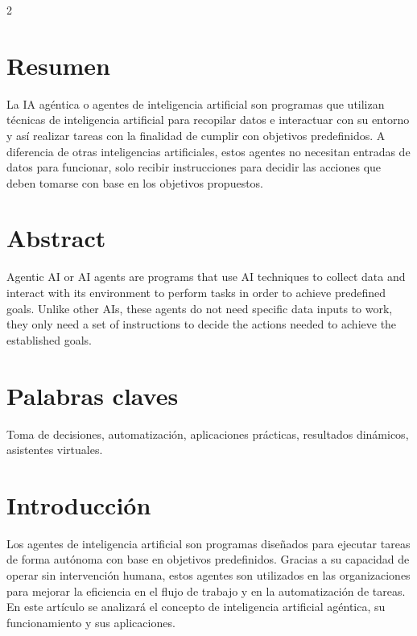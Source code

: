 \documentclass[12pt,spanish,Letterpaper,openany]{book}
\begin{document}
\begin {multicols}{2}

\hypertarget{resumen-7}{%
\section{Resumen}\label{resumen-7}}

La IA agéntica o agentes de inteligencia artificial son programas que utilizan técnicas de inteligencia artificial para recopilar datos e interactuar con su entorno y así realizar tareas con la finalidad de cumplir con objetivos predefinidos. A diferencia de otras inteligencias artificiales, estos agentes no necesitan entradas de datos para funcionar, solo recibir instrucciones para decidir las acciones que deben tomarse con base en los objetivos propuestos.

\hypertarget{abstract-7}{%
\section{Abstract}\label{abstract-7}}

Agentic AI or AI agents are programs that use AI techniques to collect data and interact with its environment to perform tasks in order to achieve predefined goals. Unlike other AIs, these agents do not need specific data inputs to work, they only need a set of instructions to decide the actions needed to achieve the established goals.

\hypertarget{palabras-claves-7}{%
\section{Palabras claves}\label{palabras-claves-7}}

Toma de decisiones, automatización, aplicaciones prácticas, resultados dinámicos, asistentes virtuales.

\hypertarget{introducciuxf3n-7}{%
\section{Introducción}\label{introducciuxf3n-7}}

Los agentes de inteligencia artificial son programas diseñados para ejecutar tareas de forma autónoma con base en objetivos predefinidos. Gracias a su capacidad de operar sin intervención humana, estos agentes son utilizados en las organizaciones para mejorar la eficiencia en el flujo de trabajo y en la automatización de tareas. En este artículo se analizará el concepto de inteligencia artificial agéntica, su funcionamiento y sus aplicaciones.


\end{multicols}
\end{document}
